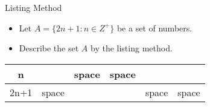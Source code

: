 
{Listing Method}

\begin{itemize}
\item Let $A = \{2n+1 : n \in Z^{+}\}$ be a set of numbers.
\item Describe the set $A$ by the listing method.
\end{itemize} 
\begin{center}
\begin{tabular}{|c|c|c|c|c|c|}
\hline n &  &{\color{white} space}  & {\color{white} space} &  &  \\ 
\hline 2n+1 &{\color{white} space}  &  &  & {\color{white} space} &{\color{white} space}  \\ 
\hline 
\end{tabular} 
\end{center}






